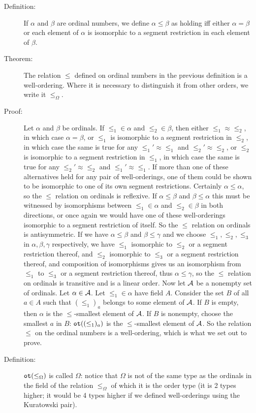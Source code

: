 \documentclass[12pt]{book}
\begin{document}
\begin{description}
\item[Definition:] If $\alpha$ and $\beta$ are ordinal numbers, we
define $\alpha \leq \beta$ as holding iff either $\alpha = \beta$ or
each element of $\alpha$ is isomorphic to a segment restriction in
each element of $\beta$.

\item[Theorem:] The relation $\leq$ defined on ordinal numbers in the
previous definition is a well-ordering.  Where it is necessary to
distinguish it from other orders, we write it $\leq_{\Omega}$.  

\item[Proof:] Let $\alpha$ and $\beta$ be ordinals.  If $\leq_1 \in \alpha$
and $\leq_2 \in \beta$, then either $\leq_1 \approx \leq_2$, in which case
$\alpha=\beta$, or $\leq_1$ is isomorphic to a segment restriction in
$\leq_2$, in which case the same is true for any $\leq_1' \approx
\leq_1$ and $\leq_2' \approx \leq_2$, or $\leq_2$ is isomorphic to a
segment restriction in $\leq_1$, in which case the same is true for
any $\leq_2' \approx \leq_2$ and $\leq_1' \approx \leq_1$.  If more
than one of these alternatives held for any pair of well-orderings,
one of them could be shown to be isomorphic to one of its own segment
restrictions.  Certainly $\alpha \leq \alpha$, so the $\leq$ relation
on ordinals is reflexive.  If $\alpha\leq \beta$ and $\beta \leq
\alpha$ this must be witnessed by isomorphisms between $\leq_1 \in
\alpha$ and $\leq_2 \in \beta$ in both directions, or once again we
would have one of these well-orderings isomorphic to a segment
restriction of itself.  So the $\leq$ relation on ordinals is
antisymmetric.  If we have $\alpha\leq \beta$ and $\beta \leq \gamma$
and we choose $\leq_1,\leq_2,\leq_3$ in $\alpha,\beta,\gamma$
respectively, we have $\leq_1$ isomorphic to $\leq_2$ or a segment
restriction thereof, and $\leq_2$ isomorphic to $\leq_3$ or a segment
restriction thereof, and composition of isomorphisms gives us an
isomorphism from $\leq_1$ to $\leq_3$ or a segment restriction
thereof, thus $\alpha \leq \gamma$, so the $\leq$ relation on ordinals
is transitive and is a linear order.  Now let $\cal A$ be a nonempty
set of ordinals.  Let $\alpha \in {\cal A}$.  Let $\leq_1 \in \alpha$
have field $A$.  Consider the set $B$ of all $a \in A$ such that
$(\leq_1)_a$ belongs to some element of $\cal A$.  If $B$ is
empty, then $\alpha$ is the $\leq$-smallest element of $\cal A$.  If
$B$ is nonempty, choose the smallest $a$ in $B$: ${\tt
ot}((\leq_1)_a)$ is the $\leq$-smallest element of $\cal A$.  So the
relation $\leq$ on the ordinal numbers is a well-ordering, which is
what we set out to prove.

\item[Definition:]  ${\tt
ot}(\leq_{\Omega})$ is called $\Omega$: notice that $\Omega$ is not of
the same type as the ordinals in the field of the relation $\leq_{\Omega}$ of which it is the order type (it is 2 types higher; it would
be 4 types higher if we defined well-orderings using the Kuratowski pair).

\end{description}
\end{document}
